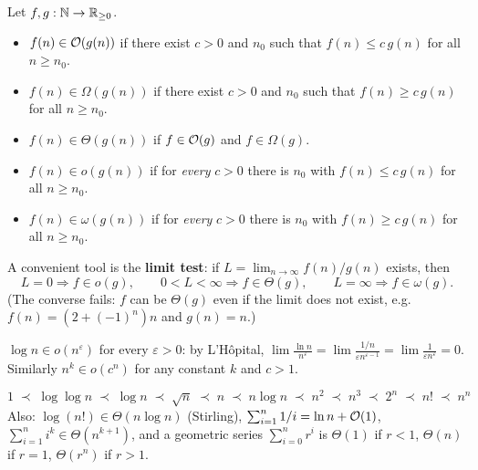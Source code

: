 \begin{definition}
Let $f,g:\mathbb{N}\to\mathbb{R}_{\ge 0}$.
\begin{itemize}
  \item $f(n)\in\mathcal{O}(g(n))$ if there exist $c>0$ and $n_0$ such that
        $f(n)\le c\,g(n)$ for all $n\ge n_0$.
  \item $f(n)\in\Omega(g(n))$ if there exist $c>0$ and $n_0$ such that
        $f(n)\ge c\,g(n)$ for all $n\ge n_0$.
  \item $f(n)\in\Theta(g(n))$ if $f\in\mathcal{O}(g)$ and $f\in\Omega(g)$.
  \item $f(n)\in o(g(n))$ if for \emph{every} $c>0$ there is $n_0$ with
        $f(n)\le c\,g(n)$ for all $n\ge n_0$.
  \item $f(n)\in\omega(g(n))$ if for \emph{every} $c>0$ there is $n_0$ with
        $f(n)\ge c\,g(n)$ for all $n\ge n_0$.
\end{itemize}
\end{definition}

A convenient tool is the \textbf{limit test}: if $L=\lim_{n\to\infty} f(n)/g(n)$ exists, then
\[
L=0 \Rightarrow f\in o(g),\qquad 0<L<\infty \Rightarrow f\in\Theta(g),\qquad L=\infty\Rightarrow f\in\omega(g).
\]
(The converse fails: $f$ can be $\Theta(g)$ even if the limit does not exist,
e.g.\ $f(n)=(2+(-1)^n)n$ and $g(n)=n$.)

\begin{example}
$\log n\in o(n^\varepsilon)$ for every $\varepsilon>0$: by L'H\^opital,
$\lim \frac{\ln n}{n^\varepsilon}=\lim\frac{1/n}{\varepsilon n^{\varepsilon-1}}=\lim\frac{1}{\varepsilon n^\varepsilon}=0$.
Similarly $n^k\in o(c^n)$ for any constant $k$ and $c>1$.
\end{example}

\begin{important}
\[
1 \;\prec\; \log\log n \;\prec\; \log n \;\prec\; \sqrt n \;\prec\; n \;\prec\; n\log n \;\prec\; n^2 \;\prec\; n^3 \;\prec\; 2^n \;\prec\; n! \;\prec\; n^n
\]
Also: $\log(n!)\in\Theta(n\log n)$ (Stirling), $\sum_{i=1}^n 1/i = \ln n+\mathcal{O}(1)$,
$\sum_{i=1}^n i^k\in\Theta(n^{k+1})$, and a geometric series $\sum_{i=0}^n r^i$ is
$\Theta(1)$ if $r<1$, $\Theta(n)$ if $r=1$, $\Theta(r^n)$ if $r>1$.
\end{important}


